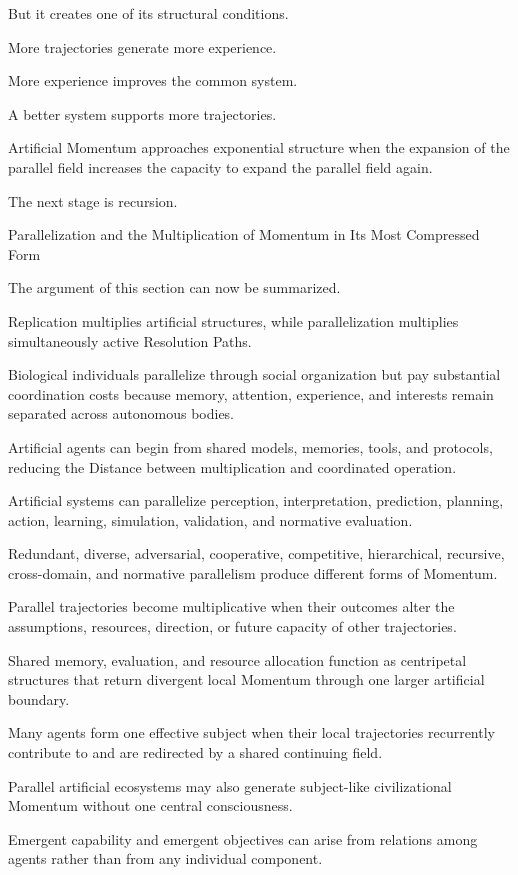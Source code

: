 But it creates one of its structural conditions.

More trajectories generate more experience.

More experience improves the common system.

A better system supports more trajectories.

Artificial Momentum approaches exponential structure when the expansion of the parallel field increases the capacity to expand the parallel field again.

The next stage is recursion.

Parallelization and the Multiplication of Momentum in Its Most Compressed Form

The argument of this section can now be summarized.

Replication multiplies artificial structures, while parallelization multiplies simultaneously active Resolution Paths.

Biological individuals parallelize through social organization but pay substantial coordination costs because memory, attention, experience, and interests remain separated across autonomous bodies.

Artificial agents can begin from shared models, memories, tools, and protocols, reducing the Distance between multiplication and coordinated operation.

Artificial systems can parallelize perception, interpretation, prediction, planning, action, learning, simulation, validation, and normative evaluation.

Redundant, diverse, adversarial, cooperative, competitive, hierarchical, recursive, cross-domain, and normative parallelism produce different forms of Momentum.

Parallel trajectories become multiplicative when their outcomes alter the assumptions, resources, direction, or future capacity of other trajectories.

Shared memory, evaluation, and resource allocation function as centripetal structures that return divergent local Momentum through one larger artificial boundary.

Many agents form one effective subject when their local trajectories recurrently contribute to and are redirected by a shared continuing field.

Parallel artificial ecosystems may also generate subject-like civilizational Momentum without one central consciousness.

Emergent capability and emergent objectives can arise from relations among agents rather than from any individual component.


